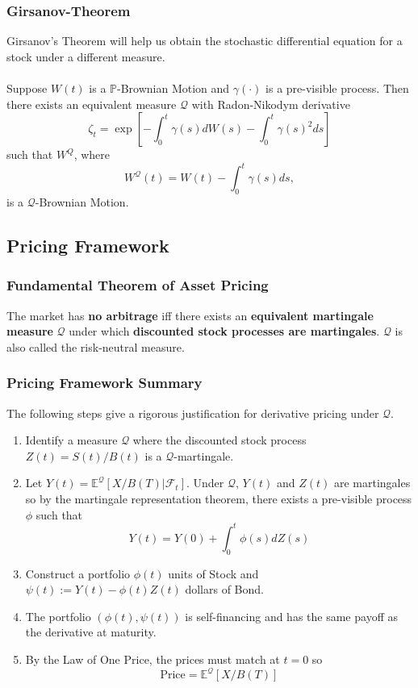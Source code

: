 \documentclass[11pt]{article}
\newcommand{\E}{\mathbb{E}}
\newcommand{\PR}{\mathbb{P}}
\newcommand{\Q}{\mathcal{Q}}
\begin{document}
	\subsubsection{Girsanov-Theorem}
	Girsanov's Theorem will help us obtain the stochastic differential equation for a stock under a different measure.\\\\
	Suppose \( W(t) \) is a \( \PR \)-Brownian Motion and \( \gamma(\cdot) \) is a pre-visible process. Then there exists an equivalent measure \( \Q \) with Radon-Nikodym derivative 
	\[	\zeta_t = \exp\left[-\int_{0}^{t}\gamma(s)dW(s) - \int_{0}^{t}\gamma(s)^2 ds\right]
		\]
	such that \( W^{Q} \), where
	\[	W^{\Q}(t) = W(t) - \int_{0}^{t} \gamma(s)ds,\]
	is a \( \Q \)-Brownian Motion.
	\subsection{Pricing Framework}
	\subsubsection{Fundamental Theorem of Asset Pricing}
	The market has \textbf{no arbitrage} iff there exists an \textbf{equivalent martingale measure} \( \Q \) under which \textbf{discounted stock processes are martingales}. \( \Q \) is also called the risk-neutral measure.
	\subsubsection{Pricing Framework Summary}
	The following steps give a rigorous justification for derivative pricing under \( \Q \).
	\begin{enumerate}
		\item Identify a measure \( \Q \) where the discounted stock process \( Z(t) = S(t)/B(t) \) is a \( \Q \)-martingale.
		\item Let \( Y(t) = \E^{\Q}\left[X/B(T)|\mathcal{F}_t\right] \). Under \( \Q \), \( Y(t) \) and \( Z(t) \) are martingales so by the martingale representation theorem, there exists a pre-visible process \( \phi \) such that
		\[	Y(t) = Y(0) + \int_{0}^{t}\phi(s)dZ(s) 
		   \]
		\item Construct a portfolio \( \phi(t) \) units of Stock and \( \psi(t) := Y(t) - \phi(t)Z(t) \) dollars of Bond.
		\item The portfolio \( (\phi(t), \psi(t)) \) is self-financing and has the same payoff as the derivative at maturity.
		\item By the Law of One Price, the prices must match at \( t = 0 \) so
		\[	\text{Price} = \E^{\Q}[X/B(T)]
			\]
	\end{enumerate}
\end{document}
